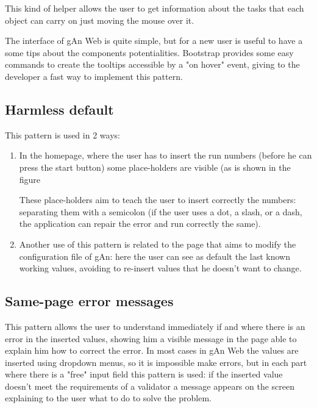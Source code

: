 This kind of helper allows the user to get information about the tasks that each object can carry on just moving the mouse over it. 


The interface of gAn Web is quite simple, but for a new user is useful to have a some tips about the components potentialities. Bootstrap provides some easy commands to create the tooltips accessible by a "on hover" event, giving to the developer a fast way to implement this pattern.

\subsection{Harmless default}

This pattern is used in 2 ways:
\begin{enumerate}

\item In the homepage, where the user has to insert the run numbers (before he can press the start button) some place-holders are visible (as is shown in the figure %


These place-holders aim to teach the user to insert correctly the numbers: separating them with a semicolon (if the user uses a dot, a slash, or a dash, the application can repair the error and run correctly the same). 

\item Another use of this pattern is related to the page that aims to modify the configuration file of gAn: here the user can see as default the last known working values, avoiding to re-insert values that he doesn't want to change.

\end{enumerate}

\subsection{Same-page error messages}

This pattern allows the user to understand immediately if and where there is an error in the inserted values, showing him a visible message in the page able to explain him how to correct the error. In most cases in gAn Web the values are inserted using dropdown menus, so it is impossible make errors, but in each part where there is a "free" input field this pattern is used: if the inserted value doesn't meet the requirements of a validator a message appears on the screen explaining to the user what to do to solve the problem.

